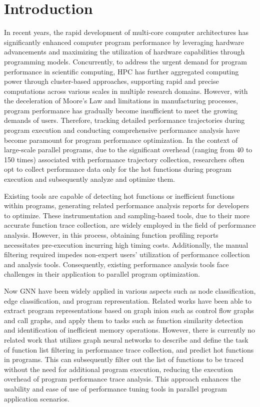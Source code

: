 \documentclass[lineno,sn-mathphys]{sn-jnl}%
\theoremstyle{thmstyleone}%
\theoremstyle{thmstyletwo}%
\theoremstyle{thmstylethree}%
\begin{document}
\section{Introduction}
\label{sec:introduction}
In recent years, the rapid development of multi-core computer architectures has significantly enhanced computer program performance by leveraging hardware advancements and maximizing the utilization of hardware capabilities through programming models. Concurrently, to address the urgent demand for program performance in scientific computing, HPC has further aggregated computing power through cluster-based approaches, supporting rapid and precise computations across various scales in multiple research domains. However, with the deceleration of Moore's Law and limitations in manufacturing processes, program performance has gradually become insufficient to meet the growing demands of users. Therefore, tracking detailed performance trajectories during program execution and conducting comprehensive performance analysis have become paramount for program performance optimization. In the context of large-scale parallel programs, due to the significant overhead (ranging from 40 to 150 times) associated with performance trajectory collection, researchers often opt to collect performance data only for the hot functions during program execution and subsequently analyze and optimize them.\par
Existing tools are capable of detecting hot functions or inefficient functions within programs, generating related performance analysis reports for developers to optimize. These instrumentation and sampling-based tools, due to their more accurate function trace collection, are widely employed in the field of performance analysis. However, in this process, obtaining function profiling reports necessitates pre-execution incurring high timing costs. Additionally, the manual filtering required impedes non-expert users' utilization of performance collection and analysis tools. Consequently, existing performance analysis tools face challenges in their application to parallel program optimization.\par
Now GNN have been widely applied in various aspects such as node classification, edge classification, and program representation. Related works have been able to extract program representations based on graph inion such as control flow graphs and call graphs, and apply them to tasks such as function similarity detection and identification of inefficient memory operations. However, there is currently no related work that utilizes graph neural networks to describe and define the task of function list filtering in performance trace collection, and predict hot functions in programs. This can subsequently filter out the list of functions to be traced without the need for additional program execution, reducing the execution overhead of program performance trace analysis. This approach enhances the usability and ease of use of performance tuning tools in parallel program application scenarios.\par
\end{document}
